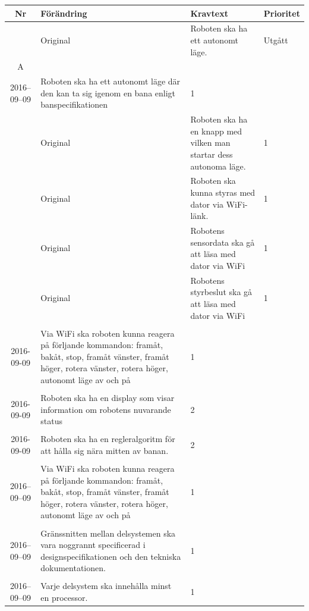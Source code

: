 \documentclass[a4paper,titlepage,12pt]{article}
\newcounter{reqNr}
\newcommand{\nextReqNr}{\stepcounter{reqNr}\arabic{reqNr}}
\newcounter{reqNrII}
\newcommand{\nextReqNrII}{\stepcounter{reqNrII}\arabic{reqNrII}}
\newcommand{\newContent}[1] {\pbox{5cm}{Nytt innehåll i \arabic{reqNr}\\#1}}
\newcommand{\newRequirement}[1] {\pbox{5cm}{Tillagt \\#1}}
\begin{document}
		\begin{longtable}[c]{ c l>{\raggedright}p{} l }
			\textbf{Nr} & \textbf{Förändring} & \textbf{Kravtext} & \textbf{Prioritet} 
				\\ \midrule
			\nextReqNr{} & Original & Roboten ska ha ett autonomt läge. & Utgått
					\\ \midrule
	
			\arabic{reqNr}A & \newContent{2016--09--09} & Roboten ska ha ett autonomt läge där den kan ta
					sig igenom en bana enligt banspecifikationen & 1
					\\ \midrule

			\nextReqNr{} & Original & Roboten ska ha en knapp med vilken man startar 
				dess autonoma läge. & 1
				\\ \midrule

			\nextReqNr{} & Original & Roboten ska kunna styras med dator 
				via WiFi-länk. & 1
				\\ \midrule
		
			\nextReqNr{} & Original & Robotens sensordata ska gå att läsa 
				med dator via WiFi & 1
				\\ \midrule

			\nextReqNr{} & Original & Robotens styrbeslut ska gå att läsa 
				med dator via WiFi & 1
                \\ \midrule
      
			\nextReqNrII & \newRequirement{2016-09-09} & Via WiFi ska roboten kunna reagera på förljande
				kommandon: framåt, bakåt, stop, framåt vänster,
				framåt höger, rotera vänster, rotera höger,
				autonomt läge av och på & 1
				\\ \hline

			\nextReqNrII & \newRequirement{2016-09-09} & Roboten ska ha en display som visar information
				om robotens nuvarande status & 2
				\\ \hline

			\nextReqNrII & \newRequirement{2016-09-09} & Roboten ska ha en regleralgoritm för att hålla sig
				nära mitten av banan. & 2
				\\ \hline

			\nextReqNrII{} & \newRequirement{2016--09--09} & Via WiFi ska roboten kunna reagera på förljande
                              kommandon: framåt, bakåt, stop, framåt vänster,
                              framåt höger, rotera vänster, rotera höger,
                              autonomt läge av och på & 1
                \\ \midrule

            \nextReqNrII{} & \newRequirement{2016--09--09} & Gränssnitten
            mellan delsystemen ska vara noggrannt specificerad i
            designspecifikationen och den tekniska dokumentationen. & 1
                \\ \midrule

            \nextReqNrII{} & \newRequirement{2016--09--09} & Varje delsystem
            ska innehålla minst en processor. & 1
				\\ 
		\end{longtable}
\end{document}

